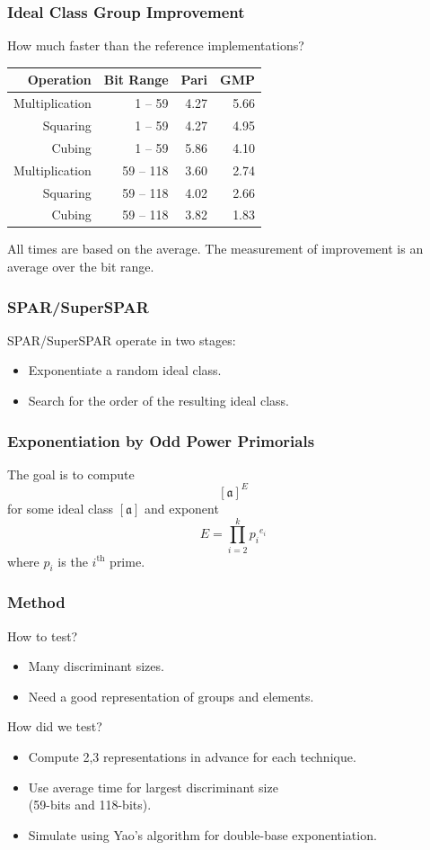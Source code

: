 \documentclass{beamer}
\newcommand{\ideal}{\mathfrak}
\newcommand{\idealclass}[1]{\left[ \ideal #1 \right]}
\newcommand{\aclass}{\idealclass a}
\newcommand{\ith}{i^{\textrm{th}}}
\newcommand{\smallfont}{\fontsize{6pt}{7.2}\selectfont}
\begin{document}
\begin{frame}
\frametitle{Ideal Class Group Improvement}
How much faster than the reference implementations?
\begin{table}
\centering
\begin{tabular}{ | r | r | r | r | }
\hline
Operation & Bit Range & Pari & GMP \\
\hline
Multiplication & 1 -- 59 & 4.27 & 5.66 \\
Squaring & 1 -- 59 & 4.27 & 4.95 \\
Cubing & 1 -- 59 & 5.86 & 4.10 \\
Multiplication & 59 -- 118 & 3.60 & 2.74 \\
Squaring & 59 -- 118 & 4.02 & 2.66 \\
Cubing & 59 -- 118 & 3.82 & 1.83 \\
\hline
\end{tabular}
\end{table}

\bigskip
\smallfont
All times are based on the average.  The measurement of improvement is an average over the bit range.
\end{frame}



\begin{frame}
\frametitle{SPAR/SuperSPAR}
SPAR/SuperSPAR operate in two stages:
\begin{itemize}
\item Exponentiate a random ideal class.
\item Search for the order of the resulting ideal class.
\end{itemize}
\end{frame}

\begin{frame}
\frametitle{Exponentiation by Odd Power Primorials}
The goal is to compute
\[
\aclass ^ E
\]
for some ideal class $\aclass$ and exponent
\[
	E = \prod_{i=2}^k {p_i}^{e_i}
\]
where $p_i$ is the $\ith$ prime.
\end{frame}

\begin{frame}
\frametitle{Method}
How to test?
\begin{itemize}
\item Many discriminant sizes.
\item Need a good representation of groups and elements.
\end{itemize}

\bigbreak
How did we test?
\begin{itemize}
\item Compute 2,3 representations in advance for each technique.
\item Use average time for largest discriminant size \\ (59-bits and 118-bits).
\item Simulate using Yao's algorithm for double-base exponentiation.
\end{itemize}
\end{frame}
\end{document}
